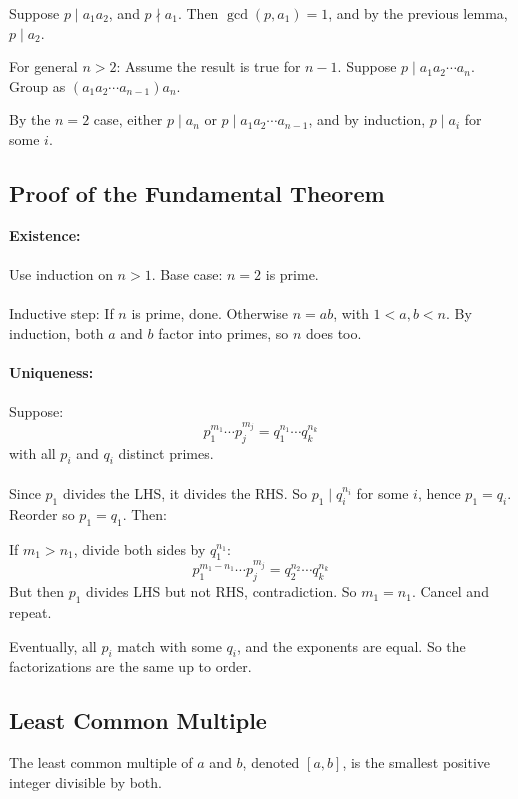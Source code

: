 Suppose \(p \mid a_1a_2\), and \(p \nmid a_1\).
Then \(\gcd(p, a_1) = 1\), and by the previous lemma, \(p \mid a_2\).

For general \(n > 2\): Assume the result is true for \(n-1\). Suppose \(p \mid a_1a_2 \cdots a_n\).
Group as \((a_1a_2 \cdots a_{n-1})a_n\).

By the \(n=2\) case, either \(p \mid a_n\) or \(p \mid a_1a_2 \cdots a_{n-1}\), and by induction, \(p \mid a_i\) for some \(i\).

\QED

\subsection{Proof of the Fundamental Theorem}

\textbf{Existence:}
\\\\
Use induction on \(n > 1\).
Base case: \(n = 2\) is prime.
\\\\
Inductive step: If \(n\) is prime, done. Otherwise \(n = ab\), with \(1 < a, b < n\).
By induction, both \(a\) and \(b\) factor into primes, so \(n\) does too.
\\\\
\textbf{Uniqueness:}
\\\\
Suppose:
\[
	p_1^{m_1} \cdots p_j^{m_j} = q_1^{n_1} \cdots q_k^{n_k}
\]
with all \(p_i\) and \(q_i\) distinct primes.
\\\\
Since \(p_1\) divides the LHS, it divides the RHS. So \(p_1 \mid q_i^{n_i}\) for some \(i\), hence \(p_1 = q_i\).
Reorder so \(p_1 = q_1\). Then:

If \(m_1 > n_1\), divide both sides by \(q_1^{n_1}\):
\[
	p_1^{m_1-n_1} \cdots p_j^{m_j} = q_2^{n_2} \cdots q_k^{n_k}
\]
But then \(p_1\) divides LHS but not RHS, contradiction. So \(m_1 = n_1\). Cancel and repeat.

Eventually, all \(p_i\) match with some \(q_i\), and the exponents are equal. So the factorizations are the same up to order.

\QED

\subsection{Least Common Multiple}

The least common multiple of \(a\) and \(b\), denoted \([a, b]\), is the smallest positive integer divisible by both.

